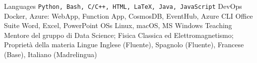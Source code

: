 

\begin{cvskills}
  \cvskill
    {Languages}
    {\texttt{Python, Bash, C/C++, HTML, LaTeX, Java, JavaScript}}
  \cvskill
    {DevOps}
    {Docker, Azure: WebApp, Function App, CosmosDB, EventHub, Azure CLI}
  \cvskill
    {Office Suite}
    {Word, Excel, PowerPoint}
  \cvskill
    {OSs}
    {Linux, macOS, MS Windows}
  \cvskill
    {Teaching}
    {Mentore del gruppo di Data Science; Fisica Classica ed Elettromagnetismo; Proprietà della materia}
  \cvskill
    {Lingue}
    {Inglese (Fluente), Spagnolo (Fluente), Francese (Base), Italiano (Madrelingua)}
\end{cvskills}
